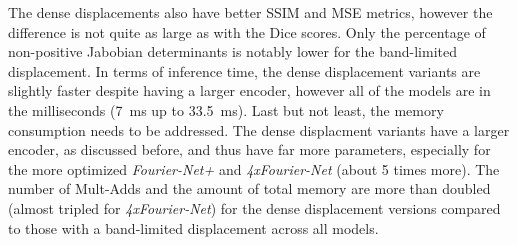 The dense displacements also have better SSIM and MSE metrics, however the difference is not quite as large as with the Dice scores. 
Only the percentage of non-positive Jabobian determinants is notably lower for the band-limited displacement. 
In terms of inference time, the dense displacement variants are slightly faster despite having a larger encoder, however all of the models are in the milliseconds (7~ms up to 33.5~ms). Last but not least, the memory consumption needs to be addressed. The dense displacment variants have a larger encoder, as discussed before, and thus have far more parameters, especially for the more optimized \emph{Fourier-Net+} and \emph{4xFourier-Net} (about 5 times more). The number of Mult-Adds and the amount of total memory are more than doubled (almost tripled for \emph{4xFourier-Net}) for the dense displacement versions compared to those with a band-limited displacement across all models.

